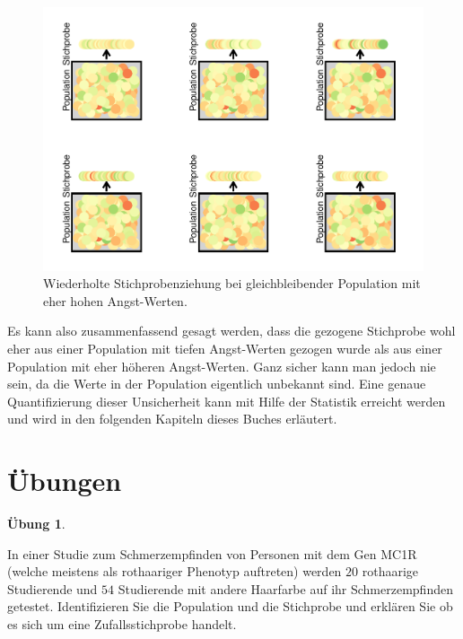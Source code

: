 \documentclass[
]{book}
\theoremstyle{definition}
\theoremstyle{definition}
\theoremstyle{definition}
\newtheorem{exercise}{Übung}[chapter]
\theoremstyle{definition}
\theoremstyle{remark}
\begin{document}
\begin{figure}
\centering
\includegraphics{aps_statistik1_files/figure-latex/srs-intervall-low-p-many-1.pdf}
\caption{\label{fig:srs-intervall-low-p-many}Wiederholte Stichprobenziehung bei gleichbleibender Population mit eher hohen Angst-Werten.}
\end{figure}

Es kann also zusammenfassend gesagt werden, dass die gezogene Stichprobe wohl eher aus einer Population mit tiefen Angst-Werten gezogen wurde als aus einer Population mit eher höheren Angst-Werten. Ganz sicher kann man jedoch nie sein, da die Werte in der Population eigentlich unbekannt sind. Eine genaue Quantifizierung dieser Unsicherheit kann mit Hilfe der Statistik erreicht werden und wird in den folgenden Kapiteln dieses Buches erläutert.

\section{Übungen}\label{uxfcbungen}

\begin{exercise}
\protect\hypertarget{exr:redhair}{}\label{exr:redhair}\leavevmode

In einer Studie zum Schmerzempfinden von Personen mit dem Gen MC1R (welche meistens als rothaariger Phenotyp auftreten) werden \(20\) rothaarige Studierende und \(54\) Studierende mit andere Haarfarbe auf ihr Schmerzempfinden getestet. Identifizieren Sie die Population und die Stichprobe und erklären Sie ob es sich um eine Zufallsstichprobe handelt.

\end{exercise}
\end{document}
